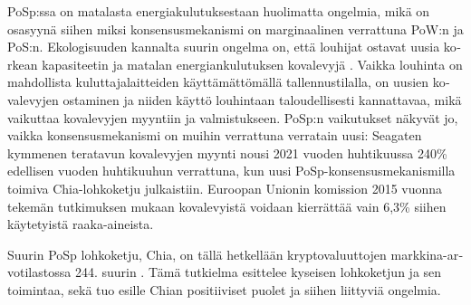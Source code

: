 \begin{otherlanguage}{english}
PoSp:ssa on matalasta energiakulutuksestaan huolimatta ongelmia, mikä on osasyynä siihen miksi konsensusmekanismi on marginaalinen verrattuna PoW:n ja PoS:n. Ekologisuuden kannalta suurin ongelma on, että louhijat ostavat uusia korkean kapasiteetin ja matalan energiankulutuksen kovalevyjä \cite{chiaseagate1, chiaseagate2}. Vaikka louhinta on mahdollista kuluttajalaitteiden käyttämättömällä tallennustilalla, on uusien kovalevyjen ostaminen ja niiden käyttö louhintaan taloudellisesti kannattavaa, mikä vaikuttaa kovalevyjen myyntiin ja valmistukseen. PoSp:n vaikutukset näkyvät jo, vaikka konsensusmekanismi on muihin verrattuna verratain uusi: Seagaten kymmenen teratavun kovalevyjen myynti nousi 2021 vuoden huhtikuussa 240\% edellisen vuoden huhtikuuhun verrattuna, kun uusi PoSp-konsensusmekanismilla toimiva Chia-lohkoketju julkaistiin. Euroopan Unionin komission 2015 vuonna tekemän tutkimuksen \cite[p.~60]{manufacturingcarbon1} mukaan kovalevyistä voidaan kierrättää vain 6,3\% siihen käytetyistä raaka-aineista.

Suurin PoSp lohkoketju, Chia, on tällä hetkellään kryptovaluuttojen markkina-arvotilastossa 244. suurin \cite{Coingecko}. Tämä tutkielma esittelee kyseisen lohkoketjun ja sen toimintaa, sekä tuo esille Chian positiiviset puolet ja siihen liittyviä ongelmia.




\end{otherlanguage}